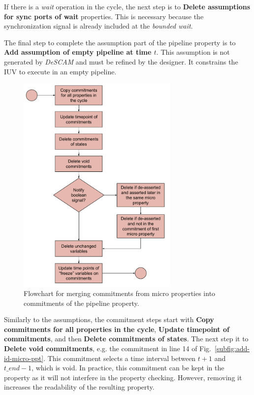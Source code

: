 If there is a \textit{wait} operation in the cycle, the next step is to \textbf{Delete assumptions for sync ports of wait} properties. This is necessary because the synchronization signal is already included at the \textit{bounded wait}.

The final step to complete the assumption part of the pipeline property is to \textbf{Add assumption of empty pipeline at time $t$}. This assumption is not generated by \textit{DeSCAM} and must be refined by the designer. It constrains the IUV to execute in an empty pipeline.

\begin{figure}[htb!]
	\centering
	\includegraphics[width=0.7\textwidth]{images/algorithm_commitments.pdf}
	\caption{Flowchart for merging commitments from micro properties into commitments of the pipeline property.}
	\label{fig:algorithm-commitments-flow}
\end{figure}

Similarly to the assumptions, the commitment steps start with \textbf{Copy commitments for all properties in the cycle}, \textbf{Update timepoint of commitments}, and then \textbf{Delete commitments of states}. The next step it to \textbf{Delete void commitments}, e.g. the commitment in line 14 of Fig.~\ref{subfig:add-id-micro-ppt}. This commitment selects a time interval between $t+1$ and $t\_end-1$, which is void. In practice, this commitment can be kept in the property as it will not interfere in the property checking. However, removing it increases the readability of the resulting property.

